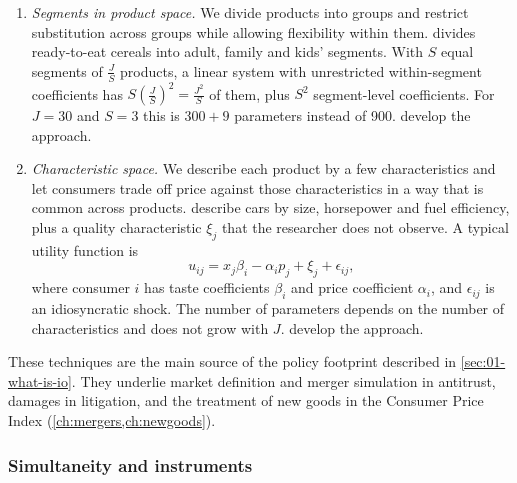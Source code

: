 \begin{enumerate}[label=(\alph*)]
  \item \emph{Segments in product space.} We divide products into groups and restrict substitution across
        groups while allowing flexibility within them. \citet{Hausman1997} divides ready-to-eat cereals into
        adult, family and kids' segments. With $S$ equal segments of $\frac{J}{S}$ products, a linear system
        with unrestricted within-segment coefficients has $S\left(\frac{J}{S}\right)^2 = \frac{J^2}{S}$ of
        them, plus $S^2$ segment-level coefficients. For $J = 30$ and $S = 3$ this is $300 + 9$ parameters
        instead of 900.  develop the approach.
  \item \emph{Characteristic space.} We describe each product by a few characteristics and let consumers
        trade off price against those characteristics in a way that is common across products.
        \citet{BerryLevinsohnPakes1995} describe cars by size, horsepower and fuel efficiency, plus a quality
        characteristic $\xi_j$ that the researcher does not observe. A typical utility function is
        \begin{equation}\label{eq:01-char-utility}
          u_{ij} = x_j\beta_i - \alpha_i p_j + \xi_j + \epsilon_{ij},
        \end{equation}
        where consumer $i$ has taste coefficients $\beta_i$ and price coefficient $\alpha_i$, and
        $\epsilon_{ij}$ is an idiosyncratic shock. The number of parameters depends on the number of
        characteristics and does not grow with $J$.  develop the approach.
\end{enumerate}

These techniques are the main source of the policy footprint described in \cref{sec:01-what-is-io}. They
underlie market definition and merger simulation in antitrust, damages in litigation, and the treatment of new
goods in the Consumer Price Index (\cref{ch:mergers,ch:newgoods}).

\subsubsection{Simultaneity and instruments}

